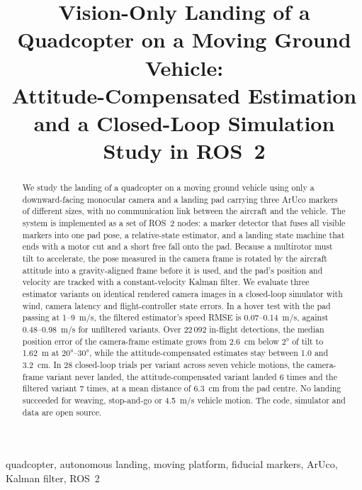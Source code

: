 \documentclass[conference]{IEEEtran}
\begin{document}
\title{Vision-Only Landing of a Quadcopter on a Moving Ground Vehicle:\\
Attitude-Compensated Estimation and a Closed-Loop Simulation Study in ROS~2}

\author{
}

\maketitle

\begin{abstract}
We study the landing of a quadcopter on a moving ground vehicle using only a downward-facing
monocular camera and a landing pad carrying three ArUco markers of different sizes, with no
communication link between the aircraft and the vehicle. The system is implemented as a set of
ROS~2 nodes: a marker detector that fuses all visible markers into one pad pose, a relative-state
estimator, and a landing state machine that ends with a motor cut and a short free fall onto the
pad. Because a multirotor must tilt to accelerate, the pose measured in the camera frame is
rotated by the aircraft attitude into a gravity-aligned frame before it is used, and the pad's
position and velocity are tracked with a constant-velocity Kalman filter. We evaluate three
estimator variants on identical rendered camera images in a closed-loop simulator with wind,
camera latency and flight-controller state errors. In a hover test with the pad passing at
1--\SI{9}{m/s}, the filtered estimator's speed RMSE is 0.07--\SI{0.14}{m/s}, against
0.48--\SI{0.98}{m/s} for unfiltered variants. Over 22\,092 in-flight detections, the median
position error of the camera-frame estimate grows from \SI{2.6}{cm} below \ang{2} of tilt to
\SI{1.62}{m} at \ang{20}--\ang{30}, while the attitude-compensated estimates stay between 1.0
and \SI{3.2}{cm}. In 28 closed-loop trials per variant across seven vehicle motions, the
camera-frame variant never landed, the attitude-compensated variant landed 6 times and the
filtered variant 7 times, at a mean distance of \SI{6.3}{cm} from the pad centre. No landing
succeeded for weaving, stop-and-go or \SI{4.5}{m/s} vehicle motion. The code, simulator and
data are open source.
\end{abstract}

\begin{IEEEkeywords}
quadcopter, autonomous landing, moving platform, fiducial markers, ArUco, Kalman filter, ROS~2
\end{IEEEkeywords}
\end{document}
